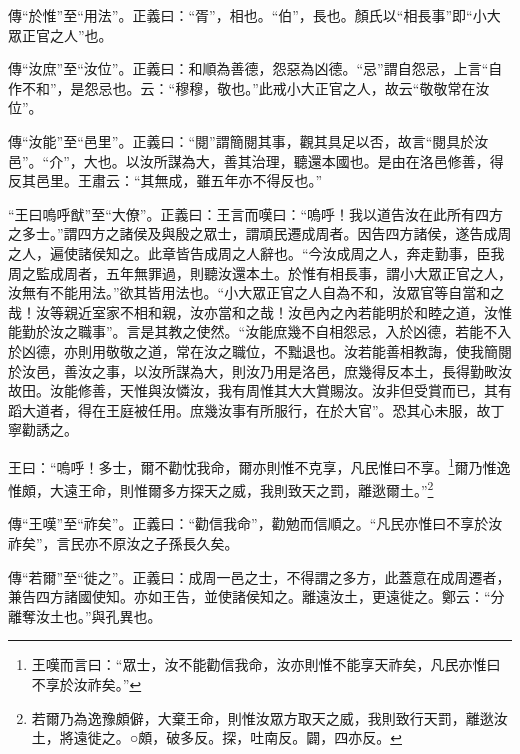 {\noindent\zhuan{}\fzbyks 傳“於惟”至“用法”。正義曰：“胥”，相也。“伯”，長也。顏氏以“相長事”即“小大眾正官之人”也。 \par}

{\noindent\zhuan{}\fzbyks 傳“汝庶”至“汝位”。正義曰：和順為善德，怨惡為凶德。“忌”謂自怨忌，上言“自作不和”，是怨忌也。云：“穆穆，敬也。”此戒小大正官之人，故云“敬敬常在汝位”。 \par}

{\noindent\zhuan{}\fzbyks 傳“汝能”至“邑里”。正義曰：“閱”謂簡閱其事，觀其具足以否，故言“閱具於汝邑”。“介”，大也。以汝所謀為大，善其治理，聽還本國也。是由在洛邑修善，得反其邑里。王肅云：“其無成，雖五年亦不得反也。” \par}

{\noindent\shu{}\fzkt “王曰嗚呼猷”至“大僚”。正義曰：王言而嘆曰：“嗚呼！我以道告汝在此所有四方之多士。”謂四方之諸侯及與殷之眾士，謂頑民遷成周者。因告四方諸侯，遂告成周之人，遍使諸侯知之。此章皆告成周之人辭也。“今汝成周之人，奔走勤事，臣我周之監成周者，五年無罪過，則聽汝還本土。於惟有相長事，謂小大眾正官之人，汝無有不能用法。”欲其皆用法也。“小大眾正官之人自為不和，汝眾官等自當和之哉！汝等親近室家不相和親，汝亦當和之哉！汝邑內之內若能明於和睦之道，汝惟能勤於汝之職事”。言是其教之使然。“汝能庶幾不自相怨忌，入於凶德，若能不入於凶德，亦則用敬敬之道，常在汝之職位，不黜退也。汝若能善相教誨，使我簡閱於汝邑，善汝之事，以汝所謀為大，則汝乃用是洛邑，庶幾得反本土，長得勤畋汝故田。汝能修善，天惟與汝憐汝，我有周惟其大大賞賜汝。汝非但受賞而已，其有蹈大道者，得在王庭被任用。庶幾汝事有所服行，在於大官”。恐其心未服，故丁寧勸誘之。 \par}

王曰：“嗚呼！多士，爾不勸忱我命，爾亦則惟不克享，凡民惟曰不享。\footnote{王嘆而言曰：“眾士，汝不能勸信我命，汝亦則惟不能享天祚矣，凡民亦惟曰不享於汝祚矣。”}爾乃惟逸惟頗，大遠王命，則惟爾多方探天之威，我則致天之罰，離逖爾土。”\footnote{若爾乃為逸豫頗僻，大棄王命，則惟汝眾方取天之威，我則致行天罰，離逖汝土，將遠徙之。○頗，破多反。探，吐南反。闢，四亦反。}


{\noindent\zhuan{}\fzbyks 傳“王嘆”至“祚矣”。正義曰：“勸信我命”，勸勉而信順之。“凡民亦惟曰不享於汝祚矣”，言民亦不原汝之子孫長久矣。 \par}

{\noindent\zhuan{}\fzbyks 傳“若爾”至“徙之”。正義曰：成周一邑之士，不得謂之多方，此蓋意在成周遷者，兼告四方諸國使知。亦如王告，並使諸侯知之。離遠汝土，更遠徙之。鄭云：“分離奪汝土也。”與孔異也。 \par}


